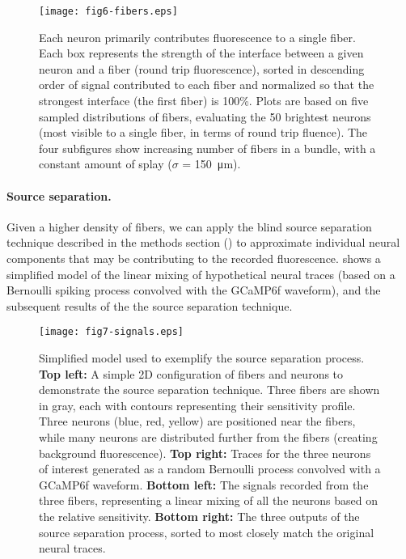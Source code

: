 \begin{figure}
\texttt{[image: fig6-fibers.eps]}
\caption[Contribution of neuron to fibers in descending order]{Each neuron primarily contributes fluorescence to a single fiber. Each box represents the strength of the interface between a given neuron and a fiber (round trip fluorescence), sorted in descending order of signal contributed to each fiber and normalized so that the strongest interface (the first fiber) is 100\%. Plots are based on five sampled distributions of fibers, evaluating the 50 brightest neurons (most visible to a single fiber, in terms of round trip fluence). The four subfigures show increasing number of fibers in a bundle, with a constant amount of splay ($\sigma$ = 150~\si{\micro\meter}).}
\label{fig:fibers}
\end{figure}

\paragraph{Source separation.} Given a higher density of fibers, we can apply the blind source separation technique described in the methods section () to approximate individual neural components that may be contributing to the recorded fluorescence.  shows a simplified model of the linear mixing of hypothetical neural traces (based on a Bernoulli spiking process convolved with the GCaMP6f waveform), and the subsequent results of the the source separation technique.

\begin{figure}
\texttt{[image: fig7-signals.eps]}
\caption[Application of source separation to simple model]{Simplified model used to exemplify the source separation process. \textbf{Top left:} A simple 2D configuration of fibers and neurons to demonstrate the source separation technique. Three fibers are shown in gray, each with contours representing their sensitivity profile. Three neurons (blue, red, yellow) are positioned near the fibers, while many neurons are distributed further from the fibers (creating background fluorescence). \textbf{Top right:} Traces for the three neurons of interest generated as a random Bernoulli process convolved with a GCaMP6f waveform. \textbf{Bottom left:} The signals recorded from the three fibers, representing a linear mixing of all the neurons based on the relative sensitivity. \textbf{Bottom right:} The three outputs of the source separation process, sorted to most closely match the original neural traces.}
\label{fig:signals}
\end{figure}

